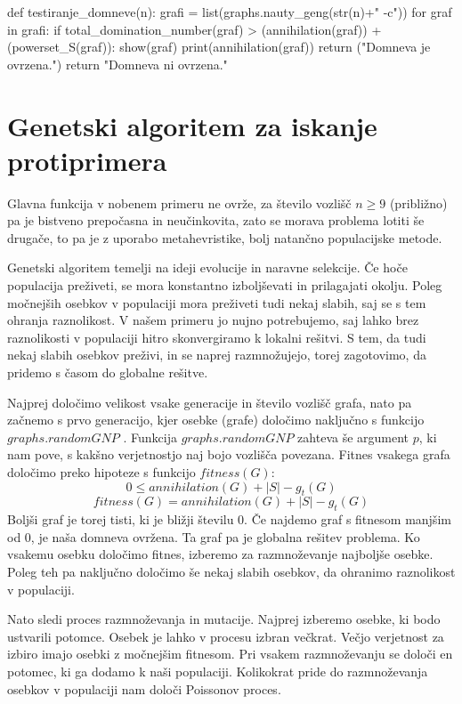 \documentclass[11pt, a4paper]{article}
\begin{document}
\begin{spverbatim}
def testiranje_domneve(n):
    grafi = list(graphs.nauty_geng(str(n)+" -c"))
    for graf in grafi:
        if total_domination_number(graf) > (annihilation(graf)) + (powerset_S(graf)):
            show(graf)
            print(annihilation(graf))
            return ("Domneva je ovrzena.")
    return "Domneva ni ovrzena."
\end{spverbatim}

\section{\textbf{Genetski algoritem za iskanje protiprimera}}
Glavna funkcija v nobenem primeru ne ovrže, za število vozlišč $n \geq 9$ (približno) pa je bistveno prepočasna in neučinkovita, zato se morava problema lotiti še drugače, to pa je z uporabo metahevristike, bolj natančno populacijske metode.
\newline

\noindent Genetski algoritem temelji na ideji evolucije in naravne selekcije. Če hoče populacija preživeti, se mora konstantno izboljševati in prilagajati okolju. Poleg močnejših osebkov v populaciji mora preživeti tudi nekaj slabih, saj se s tem ohranja raznolikost. V našem primeru jo nujno potrebujemo, saj lahko brez raznolikosti v populaciji hitro skonvergiramo k lokalni rešitvi. S tem, da tudi nekaj slabih osebkov preživi, in se naprej razmnožujejo, torej zagotovimo, da pridemo s časom do globalne rešitve. 
\newline

\noindent Najprej določimo velikost vsake generacije in število vozlišč grafa, nato pa začnemo s prvo generacijo, kjer osebke (grafe) določimo naključno s funkcijo $graphs.randomGNP$ . Funkcija $ graphs.randomGNP$ zahteva še argument $p$, ki nam pove, s kakšno verjetnostjo naj bojo vozlišča povezana. Fitnes vsakega grafa določimo preko hipoteze s funkcijo $fitness(G)$:
$$ 0 \leq annihilation(G) + |S| - g_t(G) $$
$$ fitness(G) = annihilation(G) + |S| - g_t(G) $$
Boljši graf je torej tisti, ki je bližji številu 0. Če najdemo graf s fitnesom manjšim od 0, je naša domneva ovržena. Ta graf pa je globalna rešitev problema. Ko vsakemu osebku določimo fitnes, izberemo za razmnoževanje najboljše osebke. Poleg teh pa naključno določimo še nekaj slabih osebkov, da ohranimo raznolikost v populaciji. 
\newline

\noindent Nato sledi proces razmnoževanja in mutacije. Najprej izberemo osebke, ki bodo ustvarili potomce. Osebek je lahko v procesu izbran večkrat. Večjo verjetnost za izbiro imajo osebki z močnejšim fitnesom. Pri vsakem razmnoževanju se določi en potomec, ki ga dodamo k naši populaciji. Kolikokrat pride do razmnoževanja osebkov v populaciji nam določi Poissonov proces.
\newline
 
\end{document}

